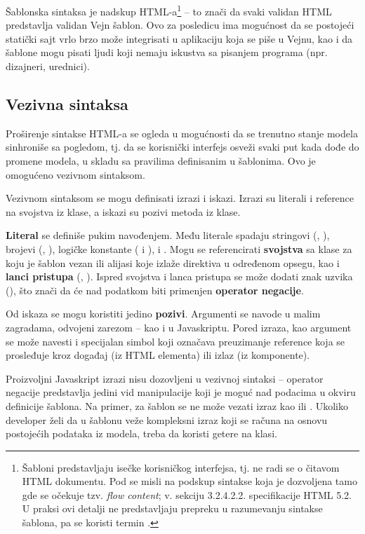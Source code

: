 Šablonska sintaksa je nadskup HTML-a\footnote{Šabloni predstavljaju isečke korisničkog interfejsa, tj. ne radi se o čitavom HTML dokumentu. Pod  se misli na podskup sintakse koja je dozvoljena tamo gde se očekuje tzv. \textsl{flow content}; v. sekciju 3.2.4.2.2. specifikacije HTML 5.2. U praksi ovi detalji ne predstavljaju prepreku u razumevanju sintakse šablona, pa se koristi termin .} -- to znači da svaki validan HTML predstavlja validan Vejn šablon.
Ovo za posledicu ima mogućnost da se postojeći statički sajt vrlo brzo može integrisati u aplikaciju koja se piše u Vejnu, kao i da šablone mogu pisati ljudi koji nemaju iskustva sa pisanjem programa (npr. dizajneri, urednici).

\subsection{Vezivna sintaksa}

Proširenje sintakse HTML-a se ogleda u mogućnosti da se trenutno stanje modela sinhroniše sa pogledom, tj. da se korisnički interfejs osveži svaki put kada dođe do promene modela, u skladu sa pravilima definisanim u šablonima.
Ovo je omogućeno vezivnom sintaksom.

Vezivnom sintaksom se mogu definisati izrazi i iskazi.
Izrazi su literali i reference na svojstva iz klase, a iskazi su pozivi metoda iz klase.

\textbf{Literal} se definiše pukim navođenjem.
Među literale spadaju stringovi (, ), brojevi (, ), logičke konstante ( i ),  i .
Mogu se referencirati \textbf{svojstva} sa klase za koju je šablon vezan ili alijasi koje izlaže direktiva u određenom opsegu, kao i \textbf{lanci pristupa} (, ).
Ispred svojstva i lanca pristupa se može dodati znak uzvika (\code{!}), što znači da će nad podatkom biti primenjen \textbf{operator negacije}.

Od iskaza se mogu koristiti jedino \textbf{pozivi}.
Argumenti se navode u malim zagradama, odvojeni zarezom -- kao i u Javaskriptu.
Pored izraza, kao argument se može navesti i specijalan simbol \code{\#} koji označava preuzimanje reference koja se prosleđuje kroz događaj (iz HTML elementa) ili izlaz (iz komponente).

Proizvoljni Javaskript izrazi nisu dozovljeni u vezivnoj sintaksi -- operator negacije predstavlja jedini vid manipulacije koji je moguć nad podacima u okviru definicije šablona.
Na primer, za šablon se ne može vezati izraz kao  ili .
Ukoliko developer želi da u šablonu veže kompleksni izraz koji se računa na osnovu postojećih podataka iz modela, treba da koristi getere na klasi.

